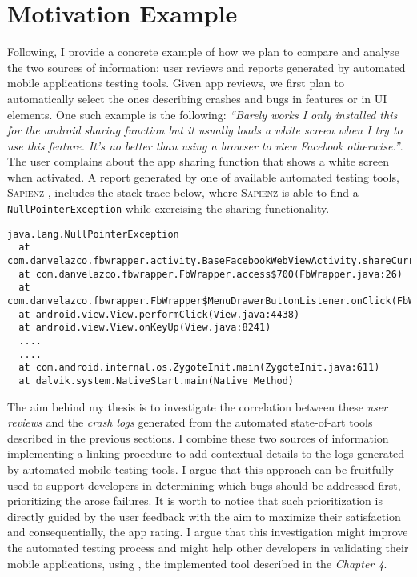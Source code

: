\section{Motivation Example}
Following, I provide a concrete example of how we plan to compare and analyse the two sources of information: user reviews and reports generated by automated mobile applications testing tools. Given app reviews, we first plan to automatically select the ones describing crashes and bugs in features or in UI elements.
One such example is the following: 
\smallbreak
\emph{\small``Barely works I only installed this for the android sharing function but it usually loads a white screen when I try to use this feature. It's no better than using a browser to view Facebook otherwise.''}. 
\smallbreak
The user complains about the app sharing function that shows a white screen when activated. A report generated by one of available automated testing tools, \textsc{Sapienz} \cite{sapienz}, includes the stack trace below, where \textsc{Sapienz} is able to find a \texttt{NullPointerException} while exercising the sharing functionality. 
\begin{lstlisting}[basicstyle=\fontsize{6}{8}\ttfamily]
java.lang.NullPointerException
  at com.danvelazco.fbwrapper.activity.BaseFacebookWebViewActivity.shareCurrentPage(BaseFacebookWebViewActivity.java:418)
  at com.danvelazco.fbwrapper.FbWrapper.access$700(FbWrapper.java:26)
  at com.danvelazco.fbwrapper.FbWrapper$MenuDrawerButtonListener.onClick(FbWrapper.java:376)
  at android.view.View.performClick(View.java:4438)
  at android.view.View.onKeyUp(View.java:8241)
  ....
  ....
  at com.android.internal.os.ZygoteInit.main(ZygoteInit.java:611)
  at dalvik.system.NativeStart.main(Native Method)
\end{lstlisting}

The aim behind my thesis is to investigate the correlation between these \textit{user reviews} and the \textit{crash logs} generated from the automated state-of-art tools described in the previous sections. 
I combine these two sources of information implementing a linking procedure to add contextual details to the logs generated by automated mobile testing tools. I argue that this approach can be fruitfully used to support developers in determining which bugs should be addressed first, prioritizing the arose failures. It is worth to notice that such prioritization is directly guided by the user feedback with the aim to maximize their satisfaction and consequentially, the app rating.
I argue that this investigation might improve the automated testing process and might help other developers in validating their mobile applications, using \toolname, the implemented tool described in the \textit{Chapter 4}.



